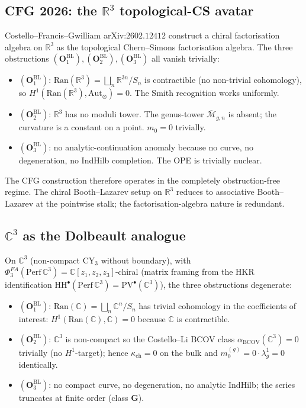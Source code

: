 \documentclass[11pt]{amsart}
\newcommand{\kch}{\kappa_{\mathrm{ch}}}
\newcommand{\Ran}{\mathrm{Ran}}
\newcommand{\Mbar}{\overline{\mathcal{M}}}
\newcommand{\Perf}{\mathrm{Perf}}
\newcommand{\HH}{\mathrm{HH}}
\newcommand{\bC}{\mathbb{C}}
\newcommand{\bR}{\mathbb{R}}
\begin{document}
\subsection{CFG 2026: the $\bR^3$ topological-CS avatar}

Costello--Francis--Gwilliam arXiv:$2602.12412$ construct a chiral
factorisation algebra on $\bR^3$ as the topological Chern--Simons
factorisation algebra. The three obstructions
$(\mathbf{O}_1^{\mathrm{BL}}), (\mathbf{O}_2^{\mathrm{BL}}),
(\mathbf{O}_3^{\mathrm{BL}})$ all vanish trivially:
\begin{itemize}[leftmargin=2em]
\item $(\mathbf{O}_1^{\mathrm{BL}})$: $\Ran(\bR^3) = \bigsqcup_n
\bR^{3n}/S_n$ is contractible (no non-trivial cohomology), so
$H^1(\Ran(\bR^3), \mathrm{Aut}_\otimes) = 0$. The Smith
recognition works uniformly.
\item $(\mathbf{O}_2^{\mathrm{BL}})$: $\bR^3$ has no moduli tower.
The genus-tower $\Mbar_{g,n}$ is absent; the curvature is a
constant on a point. $m_0 = 0$ trivially.
\item $(\mathbf{O}_3^{\mathrm{BL}})$: no analytic-continuation
anomaly because no curve, no degeneration, no IndHilb completion.
The OPE is trivially nuclear.
\end{itemize}

The CFG construction therefore operates in the completely
obstruction-free regime. The chiral Booth--Lazarev setup on
$\bR^3$ reduces to associative Booth--Lazarev at the pointwise
stalk; the factorisation-algebra nature is redundant.

\subsection{$\bC^3$ as the Dolbeault analogue}

On $\bC^3$ (non-compact CY$_3$ without boundary), with
$\Phi^{FA}_3(\Perf\,\bC^3) = \bC[z_1, z_2, z_3]$-chiral (matrix
framing from the HKR identification $\HH^\bullet(\Perf\,\bC^3) =
\mathrm{PV}^\bullet(\bC^3)$), the three obstructions degenerate:
\begin{itemize}[leftmargin=2em]
\item $(\mathbf{O}_1^{\mathrm{BL}})$: $\Ran(\bC) = \bigsqcup_n
\bC^n/S_n$ has trivial cohomology in the coefficients of
interest: $H^1(\Ran(\bC), \bC) = 0$ because $\bC$ is contractible.
\item $(\mathbf{O}_2^{\mathrm{BL}})$: $\bC^3$ is non-compact so the
Costello--Li BCOV class $\alpha_{\mathrm{BCOV}}(\bC^3) = 0$
trivially (no $H^1$-target); hence $\kch = 0$ on the bulk and
$m_0^{(g)} = 0 \cdot \lambda_g^1 = 0$ identically.
\item $(\mathbf{O}_3^{\mathrm{BL}})$: no compact curve, no
degeneration, no analytic IndHilb; the series truncates at
finite order (class $\mathbf{G}$).
\end{itemize}
\end{document}

